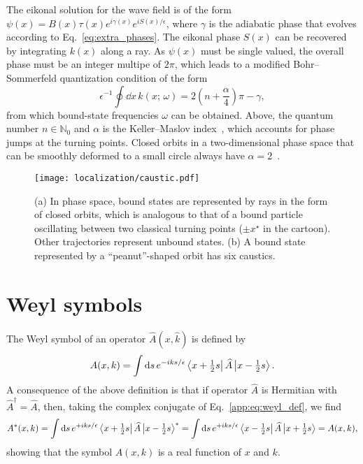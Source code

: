 The eikonal solution for the wave field is of the form $\psi(x) = B(x)\tau(x) e^{i\gamma(x)} e^{iS(x)/\epsilon}$, where $\gamma$ is the adiabatic phase that evolves according to Eq.~\eqref{eq:extra_phases}.
The eikonal phase $S(x)$ can be recovered by integrating $k(x)$ along a ray.
As $\psi(x)$ must be single valued, the overall phase must be an integer multipe of $2\pi$, which leads to a modified Bohr--Sommerfeld quantization condition of the form
%
\begin{equation}
  \epsilon^{-1}\oint \dd{x}\,k(x;\, \omega) = 2\left(n + \frac{\alpha}{4}\right)\pi - \gamma,
  \label{eq:quantization}
\end{equation}
%
from which bound-state frequencies $\omega$ can be obtained.
Above, the quantum number $n \in \mathbb{N}_{0}$ and $\alpha$ is the Keller--Maslov index~\cite{keller1958,maslov1981}, which accounts for phase jumps at the turning points.
Closed orbits in a two-dimensional phase space that can be smoothly deformed to a small circle always have $\alpha = 2$~\cite{percival1977}.
%
\begin{figure}
  \begin{center}
    \texttt{[image: localization/caustic.pdf]}
  \end{center}
  \caption{%
    (a) In phase space, bound states are represented by rays in the form of closed orbits, which is analogous to that of a bound particle oscillating between two classical turning points ($\pm x^{\star}$ in the cartoon).
    Other trajectories represent unbound states.
    (b) A bound state represented by a ``peanut''-shaped orbit has six caustics.%
  }
  \label{fig:caustic}
\end{figure}

\section{Weyl symbols}

The Weyl symbol of an operator $\widehat{A}(x, \hat{k})$ is defined by
%
\begin{equation}
  A(x, k) = \int \mathrm{d}{s}\, e^{-iks/\epsilon} \left\langle x + \tfrac{1}{2}s\right|\widehat{A}\left|x - \tfrac{1}{2}s\right\rangle.
  \label{app:eq:weyl_def}
\end{equation}
%
A consequence of the above definition is that if operator $\widehat{A}$ is Hermitian with $\widehat{A}^{\dagger} = \widehat{A}$, then, taking the complex conjugate of Eq.~\eqref{app:eq:weyl_def}, we find
%
\begin{equation}
  A^{*}(x, k) = \int \mathrm{d}{s}\, e^{+iks/\epsilon} \left\langle x + \tfrac{1}{2}s\right|\widehat{A}\left|x - \tfrac{1}{2}s\right\rangle^{*}
  = \int \mathrm{d}{s}\, e^{+iks/\epsilon} \left\langle x - \tfrac{1}{2}s\right|\widehat{A}\left|x + \tfrac{1}{2}s\right\rangle = A(x, k),
  \label{eq:weylsym}
\end{equation}
%
showing that the symbol $A(x, k)$ is a real function of $x$ and $k$.
